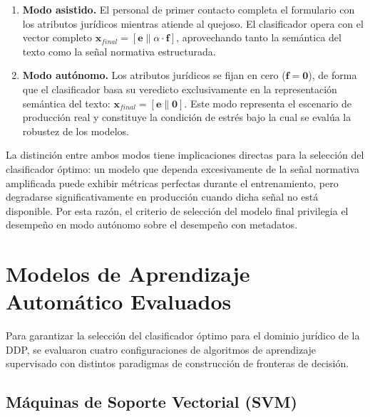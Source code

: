 \begin{enumerate}
  \item \textbf{Modo asistido.} El personal de primer contacto completa el
        formulario con los atributos jurídicos mientras atiende al quejoso. El
        clasificador opera con el vector completo
        $\mathbf{x}_{final} = [\mathbf{e} \| \alpha \cdot \mathbf{f}]$,
        aprovechando tanto la semántica del texto como la señal normativa
        estructurada.

  \item \textbf{Modo autónomo.} Los atributos jurídicos se fijan en cero
        ($\mathbf{f} = \mathbf{0}$), de forma que el clasificador basa su
        veredicto exclusivamente en la representación semántica del texto:
        $\mathbf{x}_{final} = [\mathbf{e} \| \mathbf{0}]$.
        Este modo representa el escenario de producción real y constituye la
        condición de estrés bajo la cual se evalúa la robustez de los modelos.
\end{enumerate}

La distinción entre ambos modos tiene implicaciones directas para la selección
del clasificador óptimo: un modelo que dependa excesivamente de la señal
normativa amplificada puede exhibir métricas perfectas durante el entrenamiento,
pero degradarse significativamente en producción cuando dicha señal no está
disponible. Por esta razón, el criterio de selección del modelo final privilegia
el desempeño en modo autónomo sobre el desempeño con metadatos.

\section{Modelos de Aprendizaje Automático Evaluados}

Para garantizar la selección del clasificador óptimo para el dominio jurídico
de la DDP, se evaluaron cuatro configuraciones de algoritmos de aprendizaje
supervisado con distintos paradigmas de construcción de fronteras de decisión.

\subsection{Máquinas de Soporte Vectorial (SVM)}


